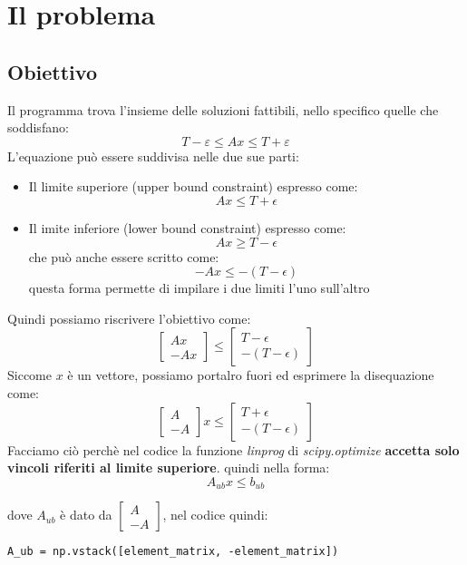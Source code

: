 \documentclass{article}
\begin{document}
\section{Il problema}

\subsection{Obiettivo}

Il programma trova l'insieme delle soluzioni fattibili, nello specifico quelle che soddisfano:
\[ T - \varepsilon \leq A x \leq T + \varepsilon \]
L'equazione può essere suddivisa nelle due sue parti:
\begin{itemize}
    \item Il limite superiore (upper bound constraint) espresso come:
    \[Ax\leq T+\epsilon\]
    \item Il imite inferiore (lower bound constraint) espresso come:
    \[Ax \geq T - \epsilon \]
    che può anche essere scritto come:
    \[-Ax \leq - (T-\epsilon)\]
    questa forma permette di impilare i due limiti l'uno sull'altro
\end{itemize}
Quindi possiamo riscrivere l'obiettivo come:
\[\begin{bmatrix} Ax \\ -Ax \end{bmatrix} \leq \begin{bmatrix} T - \epsilon \\ -(T-\epsilon) \end{bmatrix}\]
Siccome $x$ è un vettore, possiamo portalro fuori ed esprimere la disequazione come:
\[\begin{bmatrix} A \\ -A \end{bmatrix}x \leq \begin{bmatrix} T + \epsilon \\ -(T-\epsilon) \end{bmatrix}\]
Facciamo ciò perchè nel codice la funzione \textit{linprog} di \textit{scipy.optimize} \textbf{accetta solo vincoli riferiti al limite superiore}. quindi nella forma:
\[A_{ub}x \leq b_{ub}\]


dove $A_{ub}$ è dato da $\begin{bmatrix}A\\-A\end{bmatrix}$, nel codice quindi:
\begin{lstlisting}
A_ub = np.vstack([element_matrix, -element_matrix])
\end{lstlisting}
\end{document}
